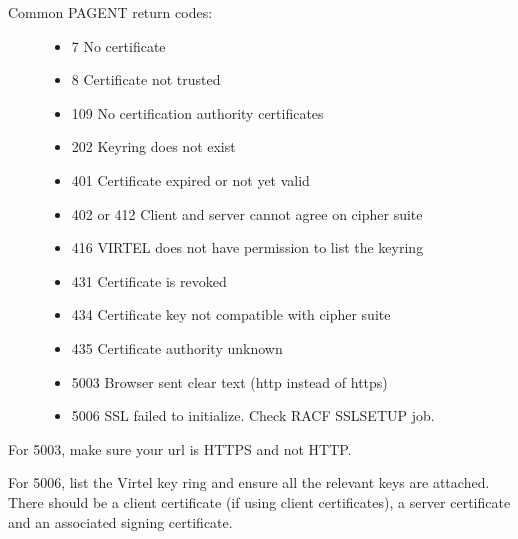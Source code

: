 \documentclass[letterpaper,10pt,english]{sphinxmanual}
\begin{document}
\begin{description}
\item[{Common PAGENT return codes:}] \leavevmode\begin{itemize}
\item {} 
7 No certificate

\item {} 
8 Certificate not trusted

\item {} 
109 No certification authority certificates

\item {} 
202 Keyring does not exist

\item {} 
401 Certificate expired or not yet valid

\item {} 
402 or 412 Client and server cannot agree on cipher suite

\item {} 
416 VIRTEL does not have permission to list the keyring

\item {} 
431 Certificate is revoked

\item {} 
434 Certificate key not compatible with cipher suite

\item {} 
435 Certificate authority unknown

\item {} 
5003 Browser sent clear text (http instead of https)

\item {} 
5006 SSL failed to initialize. Check RACF SSLSETUP job.

\end{itemize}

\end{description}

For 5003, make sure your url is HTTPS and not HTTP.

For 5006, list the Virtel key ring and ensure all the relevant keys are attached. There should be a client certificate (if using client certificates), a server certificate and an associated signing certificate.
\end{document}
